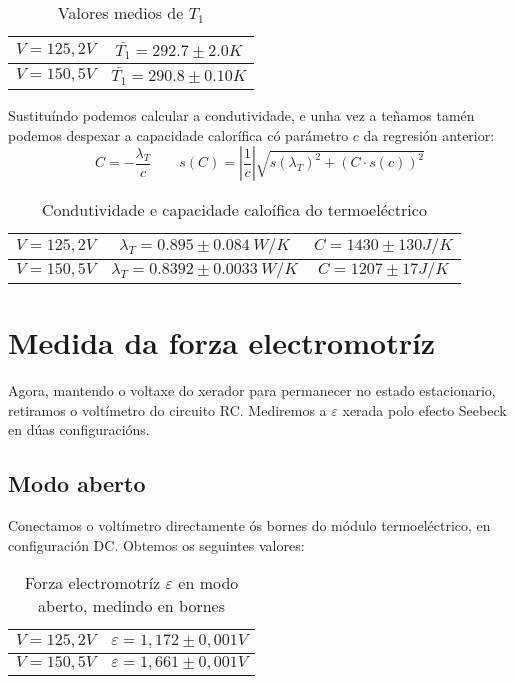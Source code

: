 \documentclass[12pt, a4paper, titlepage]{article}
\begin{document}
  \begin{table}[H]
    \centering
    \begin{tabular}{|c|c|}
      \hline
      $\mathit{V = 125,2V}$ & $\bar{T_1} = 292.7 \pm 2.0 K$ \\ \hline
      $\mathit{V = 150,5V}$ & $\bar{T_1} = 290.8 \pm 0.10 K$ \\ \hline
    \end{tabular}
    \caption{Valores medios de $T_1$}
    \label{cadro:5}
  \end{table}

  Sustituíndo podemos calcular a condutividade, e unha vez a teñamos tamén podemos despexar a capacidade calorífica có parámetro $c$ da regresión anterior:
  \begin{equation}
    C = - \frac{\lambda_T}{c} \qquad s(C) = \left\vert \frac{1}{c} \right\vert \sqrt{s(\lambda_T)^2 + (C \cdot s(c))^2}
  \end{equation}

  \begin{table}[H]
    \centering
    \begin{tabular}{|c|c|c|}
      \hline
      $\mathit{V = 125,2V}$ & $\lambda_T = 0.895 \pm 0.084 \ W/K$ & $C = 1430 \pm 130 J/K$ \\ \hline
      $\mathit{V = 150,5V}$ & $\lambda_T = 0.8392 \pm 0.0033 \ W/K$ & $C = 1207 \pm 17 J/K$ \\ \hline
    \end{tabular}
    \caption{Condutividade e capacidade caloífica do termoeléctrico}
  \end{table}



  \section{Medida da forza electromotríz}

  Agora, mantendo o voltaxe do xerador para permanecer no estado estacionario, retiramos o voltímetro do circuito RC.
  Mediremos a $\varepsilon$ xerada polo efecto Seebeck en dúas configuracións.

  \subsection{Modo aberto}

  Conectamos o voltímetro directamente ós bornes do módulo termoeléctrico, en configuración DC. Obtemos os seguintes valores:

  \begin{table}[H]
    \centering
    \begin{tabular}{|c|c|}
      \hline
      $\mathit{V = 125,2V}$ & $\varepsilon = 1,172 \pm 0,001V$ \\ \hline
      $\mathit{V = 150,5V}$ & $\varepsilon = 1,661 \pm 0,001V$ \\ \hline
    \end{tabular}
    \caption{Forza electromotríz $\varepsilon$ en modo aberto, medindo en bornes}
  \end{table}
\end{document}
